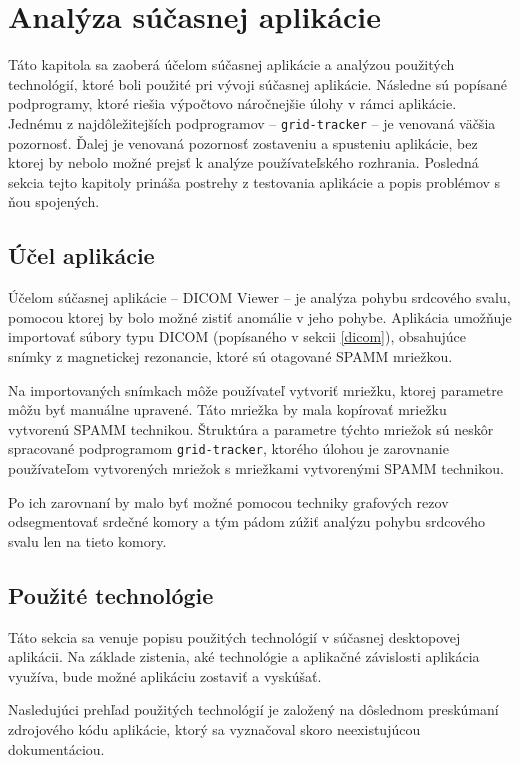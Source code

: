 \chapter {Analýza súčasnej aplikácie}
Táto kapitola sa zaoberá účelom súčasnej aplikácie a analýzou použitých technológií, ktoré boli použité pri vývoji súčasnej aplikácie. Následne sú popísané podprogramy, ktoré riešia výpočtovo náročnejšie úlohy v rámci aplikácie. Jednému z najdôležitejších podprogramov -- \texttt{grid-tracker} -- je venovaná väčšia pozornosť. Ďalej je venovaná pozornosť zostaveniu a spusteniu aplikácie, bez ktorej by nebolo možné prejsť k analýze používateľského rozhrania. Posledná sekcia tejto kapitoly prináša postrehy z testovania aplikácie a popis problémov s ňou spojených.

\section {Účel aplikácie}
Účelom súčasnej aplikácie -- DICOM Viewer -- je analýza pohybu srdcového svalu, pomocou ktorej by bolo možné zistiť anomálie v jeho pohybe. Aplikácia umožňuje importovať súbory typu DICOM (popísaného v sekcii \ref{dicom}), obsahujúce snímky z magnetickej rezonancie, ktoré sú otagované SPAMM mriežkou.

Na importovaných snímkach môže používateľ vytvoriť mriežku, ktorej parametre môžu byť manuálne upravené. Táto mriežka by mala kopírovať mriežku vytvorenú SPAMM technikou. Štruktúra a parametre týchto mriežok sú neskôr spracované podprogramom \texttt{grid-tracker}, ktorého úlohou je zarovnanie používateľom vytvorených mriežok s mriežkami vytvorenými SPAMM technikou.

\clearpage
Po ich zarovnaní by malo byť možné pomocou techniky grafových rezov odsegmentovať srdečné komory a tým pádom zúžiť analýzu pohybu srdcového svalu len na tieto komory.

\section {Použité technológie}
Táto sekcia sa venuje popisu použitých technológií v súčasnej desktopovej aplikácii. Na základe zistenia, aké technológie a aplikačné závislosti aplikácia využíva, bude možné aplikáciu zostaviť a vyskúšať.

Nasledujúci prehľad použitých technológií je založený na dôslednom preskúmaní zdrojového kódu aplikácie, ktorý sa vyznačoval skoro neexistujúcou dokumentáciou.

